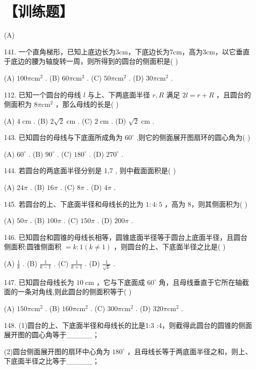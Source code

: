 \documentclass[10pt]{article}
\begin{document}
\section*{【训练题】}

(A)

141. 一个直角梯形，已知上底边长为3cm，下底边长为7cm，高为3cm，以它垂直于底边的腰为轴旋转一周，则所得到的圆台的侧面积是( )

(A) \({100\pi }{\mathrm{{cm}}}^{2}\) . (B) \({60\pi }{\mathrm{{cm}}}^{2}\) . (C) \({50\pi }{\mathrm{{cm}}}^{2}\) . (D) \({30\pi }{\mathrm{{cm}}}^{2}\) .

112. 已知一个圆台的母线 \(l\) 与上、下两底面半径 \(r,R\) 满足 \({2l} = r + R\) ，且圆台的侧面积为 \({8\pi }{\mathrm{{cm}}}^{2}\) ，那么母线的长是( )

(A) \(4\mathrm{\;{cm}}\) . (B) \(2\sqrt{2}\mathrm{\;{cm}}\) . (C) \(2\mathrm{\;{cm}}\) . (D) \(\sqrt{2}\mathrm{\;{cm}}\) .

143. 已知圆台的母线与下底面所成角为 \({60}^{ \circ  }\) ,则它的侧面展开图扇环的圆心角为( )

(A) \({60}^{ \circ  }\) . (B) \({90}^{ \circ  }\) . (C) \({180}^{ \circ  }\) . (D) \({270}^{ \circ  }\) .

144. 若圆台的两底面半径分别是 1,7 , 则中截面面积是( )

(A) \({24\pi }\) . (B) \({16\pi }\) . (C) \({8\pi }\) . (D) \({4\pi }\) .

145. 若圆台的上、下底面半径和母线长的比为 \(1 : 4 : 5\) ，高为 8，则其侧面积为( )

(A) \({50\pi }\) . (B) \({100\pi }\) . (C) \({150\pi }\) . (D) \({200\pi }\) .

146. 已知圆台和圆锥的母线长相等，圆锥底面半径等于圆台上底面半径，且圆台侧面积:圆锥侧面积 \(= k : 1\left( {k \neq  1}\right)\) ，则圆台的上、下底面半径之比是( )

(A) \(\frac{1}{k}\) . (B) \(\frac{1}{k - 1}\) . (C) \(\frac{1}{k + 1}\) . (D) \(\frac{1}{\sqrt{k}}\) .

147. 已知圆台母线长为 \({10}\mathrm{\;{cm}}\) ，它与下底面成 \({60}^{ \circ  }\) 角，且母线垂直于它所在轴截面的一条对角线,则此圆台的侧面积等于( )

(A) \({150\pi }{\mathrm{{cm}}}^{2}\) . (B) \({160\pi }{\mathrm{{cm}}}^{2}\) . (C) \({300\pi }{\mathrm{{cm}}}^{2}\) . (D) \({320\pi }{\mathrm{{cm}}}^{2}\) .

148. (1)圆台的上、下底面半径和母线长的比是1:3 :4，则截得此圆台的圆锥的侧面展开图的圆心角等于\_\_\_\_\_；

(2)圆台侧面展开图的扇环中心角为 \({180}^{ \circ  }\) ，且母线长等于两底面半径之和，则上、下底面半径之比等于\_\_\_\_\_；
\end{document}
